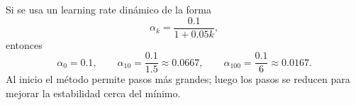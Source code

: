 \documentclass[a4,11pt]{aleph-notas}
\begin{document}
\begin{ejem}
    Si se usa un learning rate dinámico de la forma
    \[
        \alpha_k=\frac{0.1}{1+0.05k},
    \]
    entonces
    \[
        \alpha_0=0.1,\qquad
        \alpha_{10}=\frac{0.1}{1.5}\approx 0.0667,\qquad
        \alpha_{100}=\frac{0.1}{6}\approx 0.0167.
    \]
    Al inicio el método permite pasos más grandes; luego los pasos se reducen para mejorar la estabilidad cerca del mínimo.
\end{ejem}
\end{document}
